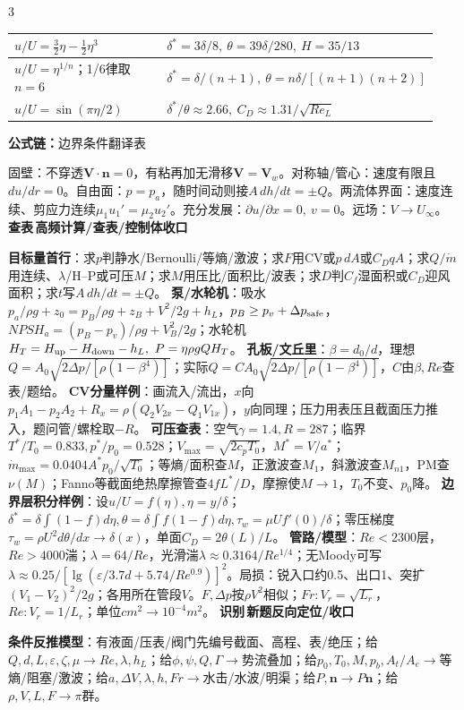 \documentclass[a4paper]{article}
\newcommand{\form}[1]{{\color{M}\bfseries 公式链：}#1\par}
\newcommand{\labtag}[3]{{\bfseries\color{#1}\colorbox{#1}{\color{white}\fontsize{2.35}{2.48}\selectfont #2}\,#3}\par}
\newcommand{\iden}[1]{\labtag{C}{识别}{#1}}
\newcommand{\lookup}[1]{\labtag{C}{查表}{#1}}
\newcommand{\idq}[1]{\iden{#1}}
\newcommand{\formq}[1]{\form{#1}}
\newcommand{\lookq}[1]{\lookup{#1}}
\newenvironment{vfourWrap}{\par\begingroup\fontsize{2.68}{2.84}\selectfont\setlength{\fboxsep}{0.45pt}}{\par\endgroup}
\begin{document}
\begin{multicols}{3}
\begin{vfourWrap}
\begin{tabular}{|p{0.42\linewidth}|p{0.52\linewidth}|}
$u/U=\frac32\eta-\frac12\eta^3$ & $\delta^*=3\delta/8,\ \theta=39\delta/280,\ H=35/13$\\\hline
$u/U=\eta^{1/n}$；1/6律取$n=6$ & $\delta^*=\delta/(n+1),\ \theta=n\delta/[(n+1)(n+2)]$\\\hline
$u/U=\sin(\pi\eta/2)$ & $\delta^*/\theta\approx2.66,\ C_D\approx1.31/\sqrt{Re_L}$\\\hline
\end{tabular}
\formq{边界条件翻译表}
固壁：不穿透$\bm V\cdot\bm n=0$，有粘再加无滑移$\bm V=\bm V_w$。对称轴/管心：速度有限且$du/dr=0$。自由面：$p=p_a$，随时间动则接$A\,dh/dt=\pm Q$。两流体界面：速度连续、剪应力连续$\mu_1u_1'=\mu_2u_2'$。充分发展：$\partial u/\partial x=0,\ v=0$。远场：$V\to U_\infty$。
\lookq{高频计算/查表/控制体收口}
{\fontsize{4.35}{4.45}\selectfont
\textbf{目标量首行}：求$p$判静水/Bernoulli/等熵/激波；求$F$用CV或$p\,dA$或$C_DqA$；求$Q/\dot m$用连续、$\lambda$/H--P或可压$M$；求$M$用压比/面积比/波表；求$D$判$C_f$湿面积或$C_D$迎风面积；求$t$写$A\,dh/dt=\pm Q$。 
\textbf{泵/水轮机}：吸水$p_a/\rho g+z_0=p_B/\rho g+z_B+V^2/2g+h_L$，$p_B\ge p_v+\Delta p_{\rm safe}$，$NPSH_a=(p_B-p_v)/\rho g+V_B^2/2g$；水轮机$H_T=H_{\rm up}-H_{\rm down}-h_L,\ P=\eta\rho gQH_T$。 
\textbf{孔板/文丘里}：$\beta=d_0/d$，理想$Q=A_0\sqrt{2\Delta p/[\rho(1-\beta^4)]}$；实际$Q=C A_0\sqrt{2\Delta p/[\rho(1-\beta^4)]}$，$C$由$\beta,Re$查表/题给。 
\textbf{CV分量样例}：画流入/流出，$x$向$p_1A_1-p_2A_2+R_x=\rho(Q_2V_{2x}-Q_1V_{1x})$，$y$向同理；压力用表压且截面压力推入，题问管/螺栓取$-R$。 
\textbf{可压查表}：空气$\gamma=1.4,R=287$；临界$T^*/T_0=0.833,p^*/p_0=0.528$；$V_{\max}=\sqrt{2c_pT_0}$，$M^*=V/a^*$；$\dot m_{\max}=0.0404A^*p_0/\sqrt{T_0}$；等熵/面积查$M$，正激波查$M_1$，斜激波查$M_{n1}$，PM查$\nu(M)$；Fanno等截面绝热摩擦管查$4fL^*/D$，摩擦使$M\to1$，$T_0$不变、$p_0$降。 
\textbf{边界层积分样例}：设$u/U=f(\eta),\eta=y/\delta$；$\delta^*=\delta\int(1-f)d\eta,\theta=\delta\int f(1-f)d\eta,\tau_w=\mu Uf'(0)/\delta$；零压梯度$\tau_w=\rho U^2d\theta/dx\to\delta(x)$，单面$C_D=2\theta(L)/L$。 
\textbf{管路/模型}：$Re<2300$层，$Re>4000$湍；$\lambda=64/Re$，光滑湍$\lambda\approx0.3164/Re^{1/4}$；无Moody可写$\lambda\approx0.25/[\lg(\varepsilon/3.7d+5.74/Re^{0.9})]^2$。局损：锐入口约0.5、出口1、突扩$(V_1-V_2)^2/2g$；各用所在管段$V$。$F,\Delta p$按$\rho V^2$相似；$Fr:V_r=\sqrt{L_r}$，$Re:V_r=1/L_r$；单位$cm^2\to10^{-4}m^2$。}
\idq{新题反向定位/收口}
{\fontsize{4.43}{4.53}\selectfont
\textbf{条件反推模型}：有液面/压表/阀门先编号截面、高程、表/绝压；给$Q,d,L,\varepsilon,\zeta,\mu\to Re,\lambda,h_L$；给$\phi,\psi,Q,\Gamma\to$势流叠加；给$p_0,T_0,M,p_b,A_t/A_e\to$等熵/阻塞/激波；给$a,\Delta V,\lambda,h,Fr\to$水击/水波/明渠；给$P,\bm n\to P\bm n$；给$\rho,V,L,F\to\pi$群。 
}
\end{vfourWrap}
\end{multicols}
\end{document}
